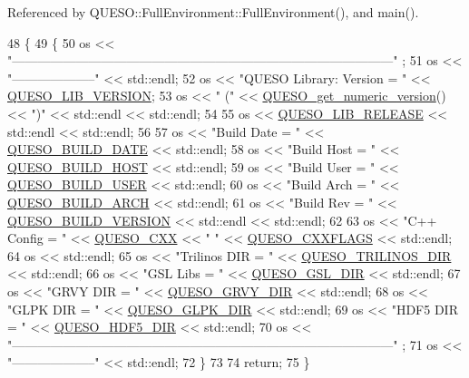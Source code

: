 Referenced by Q\-U\-E\-S\-O\-::\-Full\-Environment\-::\-Full\-Environment(), and main().


\begin{DoxyCode}
48   \{
49     \{
50       os << \textcolor{stringliteral}{"------------------------------------------------------------------------------------------"} ;
51       os << \textcolor{stringliteral}{"--------------------"} << std::endl;
52       os << \textcolor{stringliteral}{"QUESO Library: Version = "} << \hyperlink{queso_8h_a4ade4ed888e8e8984634ec507e08dcf4}{QUESO\_LIB\_VERSION};
53       os << \textcolor{stringliteral}{" ("} << \hyperlink{namespace_q_u_e_s_o_a61ed284ac8a5002856025bf21955b215}{QUESO\_get\_numeric\_version}() << \textcolor{stringliteral}{")"} << std::endl << std::endl;
54       
55       os << \hyperlink{queso_8h_a200372295aca6277053dc3198acd1fa2}{QUESO\_LIB\_RELEASE} << std::endl << std::endl;
56       
57       os << \textcolor{stringliteral}{"Build Date   = "} << \hyperlink{queso_8h_ad3f2a2a9e1a0507319ca48e4a171d7c6}{QUESO\_BUILD\_DATE}     << std::endl;
58       os << \textcolor{stringliteral}{"Build Host   = "} << \hyperlink{queso_8h_a82f0d319c13988e6ce0abfc3e5acfafd}{QUESO\_BUILD\_HOST}     << std::endl;
59       os << \textcolor{stringliteral}{"Build User   = "} << \hyperlink{queso_8h_ac220e0baec88681f8270678badb7bcb9}{QUESO\_BUILD\_USER}     << std::endl;
60       os << \textcolor{stringliteral}{"Build Arch   = "} << \hyperlink{queso_8h_aef2d7f6fe2a604b6dc962d9c53fbccad}{QUESO\_BUILD\_ARCH}     << std::endl;
61       os << \textcolor{stringliteral}{"Build Rev    = "} << \hyperlink{queso_8h_a8b36b33f2429f166778a0a9410259f1d}{QUESO\_BUILD\_VERSION}  << std::endl     << std::endl;
62       
63       os << \textcolor{stringliteral}{"C++ Config   = "} << \hyperlink{queso_8h_a5473b76f2474d904b914586f0e85575d}{QUESO\_CXX} << \textcolor{stringliteral}{" "} << \hyperlink{queso_8h_a0733ab68bd215a3d12bc6aea1d80a7e5}{QUESO\_CXXFLAGS}    << std::endl;
64       os << std::endl;
65       os << \textcolor{stringliteral}{"Trilinos DIR = "} << \hyperlink{queso_8h_a735dae31e72a24c63c02e5ed8868fcac}{QUESO\_TRILINOS\_DIR} << std::endl;
66       os << \textcolor{stringliteral}{"GSL Libs     = "} << \hyperlink{queso_8h_aad144bff960096e3e55ea946a529dc9f}{QUESO\_GSL\_DIR}  << std::endl;
67       os << \textcolor{stringliteral}{"GRVY DIR     = "} << \hyperlink{queso_8h_ae762ff926acfd3095751bf812077f02d}{QUESO\_GRVY\_DIR} << std::endl;
68       os << \textcolor{stringliteral}{"GLPK DIR     = "} << \hyperlink{queso_8h_ace4c8bf4a22ac49477823be20179d3d7}{QUESO\_GLPK\_DIR} << std::endl;
69       os << \textcolor{stringliteral}{"HDF5 DIR     = "} << \hyperlink{queso_8h_a204aeda021989ea37fbc54f1861cbfef}{QUESO\_HDF5\_DIR} << std::endl;
70       os << \textcolor{stringliteral}{"------------------------------------------------------------------------------------------"} ;
71       os << \textcolor{stringliteral}{"--------------------"} << std::endl;
72     \}
73     
74     \textcolor{keywordflow}{return};
75   \}
\end{DoxyCode}
